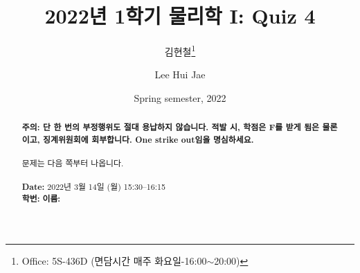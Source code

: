 \documentclass[floatfix,nofootinbib,superscriptaddress,fleqn,preprint]{revtex4}
\begin{document}
\title{\Large 2022년 1학기 물리학 I: Quiz 4}
\author{김현철\footnote{Office: 5S-436D (면담시간 매주
    화요일-16:00$\sim$20:00)}} 
\author{Lee Hui Jae} 
\date{Spring semester, 2022}


\vspace{1.cm}
\begin{abstract}
\noindent \textbf{ {\color{red}주의}: \color{blue} 단 한 번의 부정행위도 절대
  용납하지 않습니다. 적발 시, 학점은 F를 받게 됨은 물론이고,
  징계위원회에 회부합니다. One strike out임을 명심하세요.}\\
\\
문제는 다음 쪽부터 나옵니다.  \\ \\
{\bf Date:} 2022년 3월 14일 (월) 15:30--16:15
\\
{\bf 학번:} \hspace{4cm}
{\bf 이름:} 

\end{abstract}
\maketitle
\end{document}
